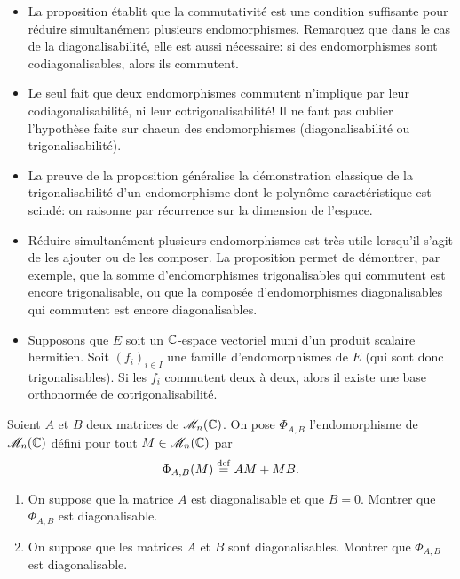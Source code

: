 \begin{remarque}
    \begin{itemize}
        \item La proposition établit que la commutativité est une condition suffisante pour réduire simultanément plusieurs endomorphismes. Remarquez que dans le cas de la diagonalisabilité, elle est aussi nécessaire: si des endomorphismes sont codiagonalisables, alors ils commutent. 
        \item Le seul fait que deux endomorphismes commutent n'implique par leur codiagonalisabilité, ni leur cotrigonalisabilité! Il ne faut pas oublier l'hypothèse faite sur chacun des endomorphismes (diagonalisabilité ou trigonalisabilité).
        \item La preuve de la proposition généralise la démonstration classique de la trigonalisabilité d'un endomorphisme dont le polynôme caractéristique est scindé: on raisonne par récurrence sur la dimension de l'espace. 
        \item Réduire simultanément plusieurs endomorphismes est très utile lorsqu'il s'agit de les ajouter ou de les composer. La proposition permet de démontrer, par exemple, que la somme d'endomorphismes trigonalisables qui commutent est encore trigonalisable, ou que la composée d'endomorphismes diagonalisables qui commutent est encore diagonalisables. 
        \item Supposons que $E$ soit un $\mathbb{C}$-espace vectoriel muni d'un produit scalaire hermitien. Soit $(f_i)_{i \in I}$ une famille d'endomorphismes de $E$ (qui sont donc trigonalisables). Si les $f_i$ commutent deux à deux, alors il existe une base orthonormée de cotrigonalisabilité. 
    \end{itemize}
\end{remarque}


\begin{exercice}
    Soient $A$ et $B$ deux matrices de $\mathscr{M}_n(\mathbb{C})$. On pose $\Phi_{A,B}$ l'endomorphisme de $\mathscr{M}_n(\mathbb{C})$ défini pour tout $M \in \mathscr{M}_n(\mathbb{C})$ par
    $$\Phi_{A,B}(M) \overset{\mathrm{\tiny def}}{=} AM + MB.$$
    \begin{enumerate}
         \item On suppose que la matrice $A$ est diagonalisable et que $B = 0$. Montrer que $\Phi_{A, B}$ est diagonalisable.
        \item On suppose que les matrices $A$ et $B$ sont diagonalisables. Montrer que $\Phi_{A, B}$ est diagonalisable. 
    \end{enumerate}
\end{exercice}

